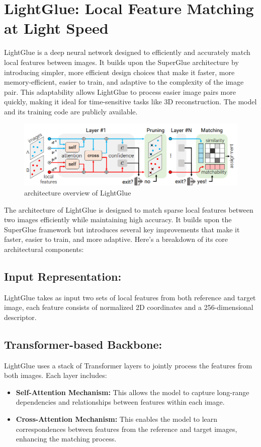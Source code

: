 \section{LightGlue: Local Feature Matching at Light Speed}
LightGlue is a deep neural network designed to efficiently and accurately match
local features between images. It builds upon the SuperGlue architecture by
introducing simpler, more efficient design choices that make it faster, more
memory-efficient, easier to train, and adaptive to the complexity of the image
pair. This adaptability allows LightGlue to process easier image pairs more
quickly, making it ideal for time-sensitive tasks like 3D reconstruction. The
model and its training code are publicly available.
\begin{figure}[h]
    \centering
    \includegraphics[width=\textwidth]{ressources/lightglue.png}
    \caption{architecture overview of LightGlue}
    \label{fig:lightglue}
\end{figure}
The architecture of LightGlue is designed to match sparse local features between two images efficiently while maintaining high accuracy. It builds upon the SuperGlue framework but introduces several key improvements that make it faster, easier to train, and more adaptive. Here's a breakdown of its core architectural components:
\subsection{Input Representation:}
LightGlue takes as input two sets of local features from both reference and
target image, each feature consists of normalized 2D coordinates and a
256-dimensional descriptor.
\subsection{Transformer-based Backbone: }
LightGlue uses a stack of Transformer layers to jointly process the features
from both images. Each layer includes:
\begin{itemize}
    \item \textbf{Self-Attention Mechanism:} This allows the model to capture long-range dependencies and relationships between features within each image.
    \item \textbf{Cross-Attention Mechanism:} This enables the model to learn correspondences between features from the reference and target images, enhancing the matching process.
\end{itemize}
